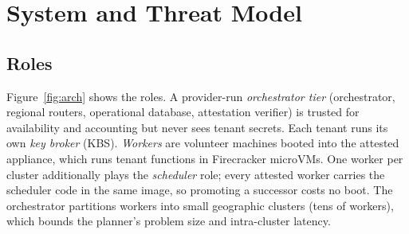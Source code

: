 \section{System and Threat Model}
\label{sec:model}

\subsection{Roles}
Figure~\ref{fig:arch} shows the roles. A provider-run \emph{orchestrator tier} (orchestrator, regional routers,
operational database, attestation verifier) is trusted for availability and accounting but never sees tenant secrets.
Each tenant runs its own \emph{key broker} (KBS). \emph{Workers} are volunteer machines booted into the attested
\voss{} appliance, which runs tenant functions in Firecracker microVMs. One worker per cluster additionally plays the
\emph{scheduler} role; every attested worker carries the scheduler code in the same image, so promoting a successor costs
no boot. The orchestrator partitions workers into small geographic clusters (tens of workers), which bounds the planner's
problem size and intra-cluster latency.

